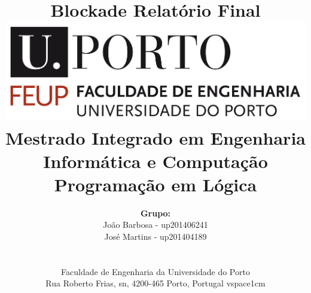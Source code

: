\documentclass[a4paper]{article}
\begin{document}
\setlength{\textwidth}{16cm}
\setlength{\textheight}{22cm}

\title{\Huge\textbf{Blockade}\linebreak\linebreak\linebreak
\Large\textbf{Relatório Final}\linebreak\linebreak
\linebreak\linebreak
\includegraphics[scale=0.1]{feup-logo.png}\linebreak\linebreak
\linebreak\linebreak
\Large{Mestrado Integrado em Engenharia Informática e Computação} \linebreak\linebreak
\Large{Programação em Lógica}\linebreak
}

\author{\textbf{Grupo:}\\  João Barbosa - up201406241 \\ José Martins - up201404189 \\\linebreak\linebreak \\
 \\ Faculdade de Engenharia da Universidade do Porto \\ Rua Roberto Frias, s\/n, 4200-465 Porto, Portugal 
vspace{1cm}}
\maketitle
\thispagestyle{empty}


\newpage
\end{document}
